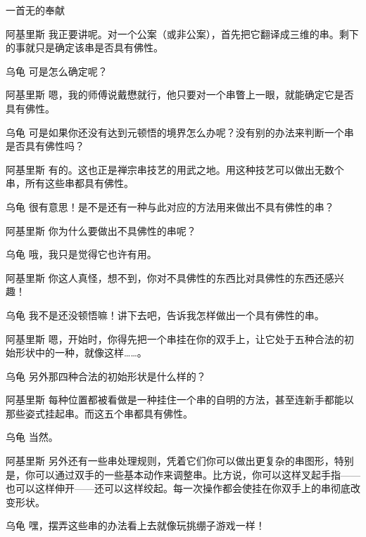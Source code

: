 \begin{dialog}{一首无的奉献\label{abcd}}
\begin{dialogue}
\item[阿基里斯]我正要讲呢。对一个公案（或非公案），首先把它翻译成三维的串。剩下的事就只是确定该串是否具有佛性。

\item[乌龟]可是怎么确定呢？

\item[阿基里斯]嗯，我的师傅说戴懋就行，他只要对一个串瞥上一眼，就能确定它是否具有佛性。

\item[乌龟]可是如果你还没有达到元顿悟的境界怎么办呢？没有别的办法来判断一个串是否具有佛性吗？

\item[阿基里斯]有的。这也正是禅宗串技艺的用武之地。用这种技艺可以做出无数个串，所有这些串都具有佛性。

\item[乌龟]很有意思！是不是还有一种与此对应的方法用来做出不具有佛性的串？

\item[阿基里斯]你为什么要做出不具佛性的串呢？

\item[乌龟]哦，我只是觉得它也许有用。

\item[阿基里斯]你这人真怪，想不到，你对不具佛性的东西比对具佛性的东西还感兴趣！

\item[乌龟]我不是还没顿悟嘛！讲下去吧，告诉我怎样做出一个具有佛性的串。

\item[阿基里斯]嗯，开始时，你得先把一个串挂在你的双手上，让它处于五种合法的初始形状中的一种，就像这样……。

\item[乌龟]另外那四种合法的初始形状是什么样的？

\item[阿基里斯]每种位置都被看做是一种挂住一个串的自明的方法，甚至连新手都能以那些姿式挂起串。而这五个串都具有佛性。

\item[乌龟]当然。

\item[阿基里斯]另外还有一些串处理规则，凭着它们你可以做出更复杂的串图形，特别是，你可以通过双手的一些基本动作来调整串。比方说，你可以这样叉起手指——也可以这样伸开——还可以这样绞起。每一次操作都会使挂在你双手上的串彻底改变形状。

\item[乌龟]嘿，摆弄这些串的办法看上去就像玩挑绷子游戏一样！


\end{dialogue}
\end{dialog}
